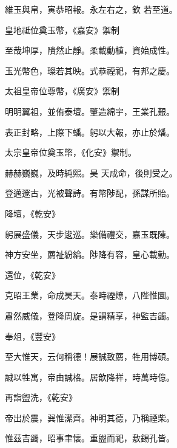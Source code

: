 \begin{pinyinscope}
 維玉與帛，寅恭昭報。永左右之，欽
 若至道。



 皇地祗位奠玉幣，《嘉安》禦制



 至哉坤厚，隤然止靜。柔載動植，資始成性。



 玉光幣色，璨若其映。式恭禋祀，有邦之慶。



 太祖皇帝位尊幣，《廣安》禦制



 明明翼祖，並侑泰壇。肇造綿宇，王業孔艱。



 表正封略，上際下蟠。躬以大報，亦止於燔。



 太宗皇帝位奠玉幣，《化安》禦制。



 赫赫巍巍，及時純熙。昊
 天成命，後則受之。



 登邁邃古，光被聲詩。有幣陟配，孫謀所貽。



 降壇，《乾安》



 躬展盛儀，天步逡巡。樂備禮交，嘉玉既陳。



 神方安坐，薦祉紛綸。陟降有容，皇心載勤。



 還位，《乾安》



 克昭王業，命成昊天。泰畤禋燎，八陛惟圜。



 肅然威儀，登降周旋。是謂精享，神監吉蠲。



 奉俎，《豐安》



 至大惟天，云何稱德！展誠致薦，牲用博碩。



 誠以牲寓，帝由誠格。居歆降祥，時萬時億。



 再詣盥洗，《乾安》



 帝出於震，巽惟潔齊。神明其德，乃稱禋柴。



 惟茲吉蠲，昭事聿懷。重盥而祀，敷錫孔皆。




\end{pinyinscope}
